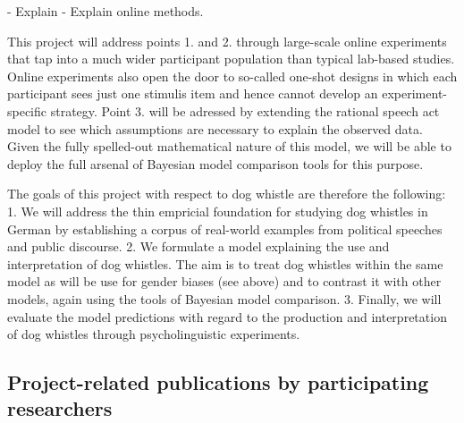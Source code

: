 \documentclass[11pt]{article}
\newcommand{\dfgcomments}[1]{\textcolor{green}{#1}}
\renewcommand{\dfgcomments}[1]{}
\begin{document}
- Explain
- Explain online methods.

This project will address points 1. and 2. through large-scale online experiments that tap into a much wider participant population than typical lab-based studies.  Online experiments also open the door to so-called one-shot designs in which each participant sees just one stimulis item and hence cannot develop an experiment-specific strategy.  Point 3. will be adressed by extending the rational speech act model to see which assumptions are necessary to explain the observed data.  Given the fully spelled-out mathematical nature of this model, we will be able to deploy the full arsenal of Bayesian model comparison tools for this purpose.

The goals of this project with respect to dog whistle are therefore the following: 1. We will address the thin empricial foundation for studying dog whistles in German by establishing a corpus of real-world examples from political speeches and public discourse.  2. We formulate a model explaining the use and interpretation of dog whistles.  The aim is to treat dog whistles within the same model as will be use for gender biases (see above) and to contrast it with other models, again using the tools of Bayesian model comparison.  3. Finally, we will evaluate the model predictions with regard to the production and interpretation of dog whistles through psycholinguistic experiments.

\subsection{Project-related publications by participating researchers}


\dfgcomments{\begin{enumerate}[a)]
  \item articles which at the time of draft proposal submission have been published or officially accepted  by  publication  outlets  with  scientific  quality  assurance,  and  book  publications;
  \item other publications;
  \item patents (subdivided into pending and issued).
  \end{enumerate}}
\end{document}
